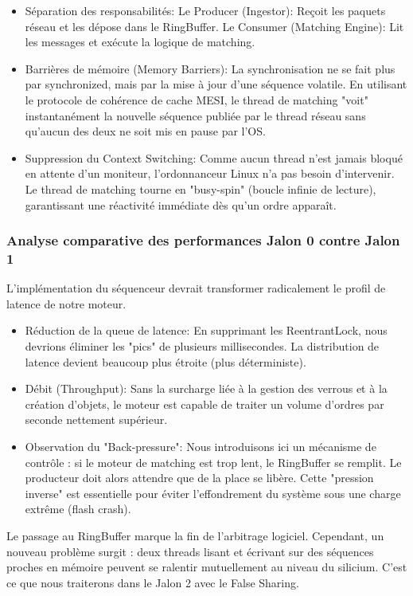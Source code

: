 \begin{itemize}
    \item Séparation des responsabilités:
        \subitem Le Producer (Ingestor): Reçoit les paquets réseau et les dépose dans le RingBuffer.
        \subitem Le Consumer (Matching Engine): Lit les messages et exécute la logique de matching.
    \item Barrières de mémoire (Memory Barriers): La synchronisation ne se fait plus par synchronized, mais par la mise à jour d'une séquence volatile. En utilisant le protocole de cohérence de cache MESI, le thread de matching "voit" instantanément la nouvelle séquence publiée par le thread réseau sans qu'aucun des deux ne soit mis en pause par l'OS.
    \item Suppression du Context Switching: Comme aucun thread n'est jamais bloqué en attente d'un moniteur, l'ordonnanceur Linux n'a pas besoin d'intervenir. Le thread de matching tourne en "busy-spin" (boucle infinie de lecture), garantissant une réactivité immédiate dès qu'un ordre apparaît.
\end{itemize}

\subsubsection{Analyse comparative des performances Jalon 0 contre Jalon 1}

L'implémentation du séquenceur devrait transformer radicalement le profil de latence de notre moteur.

\begin{itemize}
    \item Réduction de la queue de latence: En supprimant les ReentrantLock, nous devrions éliminer les "pics" de plusieurs millisecondes. La distribution de latence devient beaucoup plus étroite (plus déterministe).
    \item Débit (Throughput): Sans la surcharge liée à la gestion des verrous et à la création d'objets, le moteur est capable de traiter un volume d'ordres par seconde nettement supérieur.
    \item Observation du "Back-pressure": Nous introduisons ici un mécanisme de contrôle : si le moteur de matching est trop lent, le RingBuffer se remplit. Le producteur doit alors attendre que de la place se libère. Cette "pression inverse" est essentielle pour éviter l'effondrement du système sous une charge extrême (flash crash).
\end{itemize}

Le passage au RingBuffer marque la fin de l'arbitrage logiciel. Cependant, un nouveau problème surgit : deux threads lisant et écrivant sur des séquences proches en mémoire peuvent se ralentir mutuellement au niveau du silicium. C'est ce que nous traiterons dans le Jalon 2 avec le False Sharing.

